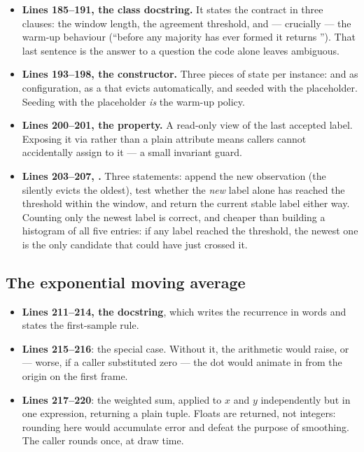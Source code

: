 \begin{itemize}
  \item \textbf{Lines 185--191, the class docstring.} It states the contract in three clauses: the
        window length, the agreement threshold, and --- crucially --- the warm-up behaviour
        (``before any majority has ever formed it returns \code{---}''). That last sentence is the
        answer to a question the code alone leaves ambiguous.
  \item \textbf{Lines 193--198, the constructor.} Three pieces of state per instance:
         and  as configuration,  as a
         that evicts automatically, and  seeded with the
        placeholder. Seeding with the placeholder \emph{is} the warm-up policy.
  \item \textbf{Lines 200--201, the  property.} A read-only view of the last accepted
        label. Exposing it via  rather than a plain attribute means callers cannot
        accidentally assign to it --- a small invariant guard.
  \item \textbf{Lines 203--207, .} Three statements: append the new observation (the
         silently evicts the oldest), test whether the \emph{new} label alone has reached
        the threshold within the window, and return the current stable label either way. Counting
        only the newest label is correct, and cheaper than building a histogram of all five entries:
        if any label reached the threshold, the newest one is the only candidate that could have just
        crossed it.
\end{itemize}

\subsection{The exponential moving average}

\begin{codecard}

\end{codecard}

\begin{itemize}
  \item \textbf{Lines 211--214, the docstring}, which writes the recurrence in words and states the
        first-sample rule.
  \item \textbf{Lines 215--216}: the  special case. Without it, the arithmetic would
        raise, or --- worse, if a caller substituted zero --- the dot would animate in from the
        origin on the first frame.
  \item \textbf{Lines 217--220}: the weighted sum, applied to $x$ and $y$ independently but in one
        expression, returning a plain tuple. Floats are returned, not integers: rounding here would
        accumulate error and defeat the purpose of smoothing. The caller rounds once, at draw time.
\end{itemize}

